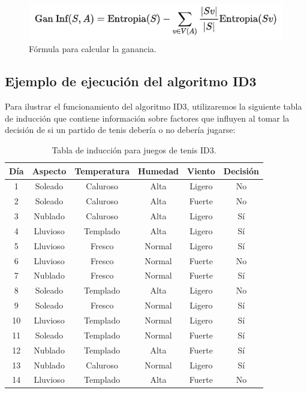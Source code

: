 \begin{figure}[!htbp]
	\hypertarget{fig:formula-ganancia}{\hspace{1pt}}
	\begin{center}
		\includegraphics{capitulo2/images/formula-ganancia.png}
		\caption{Fórmula para calcular la ganancia.}
		\label{fig:formula-ganancia}
	\end{center}
\end{figure}

\newpage
\subsection{Ejemplo de ejecución del algoritmo ID3} \label{ejecucionID3}

Para ilustrar el funcionamiento del algoritmo ID3, utilizaremos la siguiente tabla de inducción que contiene información sobre factores que influyen al tomar la decisión de si un partido de tenis debería o no debería jugarse:

\begin{table}[!hb]
	\begin{center}
		\label{tab:tablaInduccionID3}
		\begin{tabular}{c|c|c|c|c|c}
			\textbf{Día} & \textbf{Aspecto} & \textbf{Temperatura} & \textbf{Humedad} & \textbf{Viento} & \textbf{Decisión}\\
			\hline
			1 & Soleado & Caluroso & Alta & Ligero & No\\
			2 & Soleado & Caluroso & Alta & Fuerte & No\\
			3 & Nublado & Caluroso & Alta & Ligero & Sí\\
			4 & Lluvioso & Templado & Alta & Ligero & Sí\\
			5 & Lluvioso & Fresco & Normal & Ligero & Sí\\
			6 & Lluvioso & Fresco & Normal & Fuerte & No\\
			7 & Nublado & Fresco & Normal & Fuerte & Sí\\
			8 & Soleado & Templado & Alta & Ligero & No\\
			9 & Soleado & Fresco & Normal & Ligero & Sí\\
			10 & Lluvioso & Templado & Normal & Ligero & Sí\\
			11 & Soleado & Templado & Normal & Fuerte & Sí\\
			12 & Nublado & Templado & Alta & Fuerte & Sí\\
			13 & Nublado & Caluroso & Normal & Ligero & Sí\\
			14 & Lluvioso & Templado & Alta & Fuerte & No\\
		\end{tabular}
	\end{center}
	\caption{Tabla de inducción para juegos de tenis ID3.}
\end{table}

